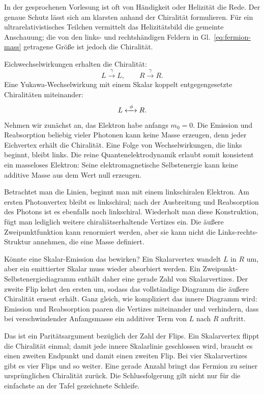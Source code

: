 In der gesprochenen Vorlesung ist oft von Händigkeit oder Helizität die Rede. Der genaue Schutz lässt sich am klarsten anhand der Chiralität formulieren. Für ein ultrarelativistisches Teilchen vermittelt das Helizitätsbild die gemeinte Anschauung; die von den links- und rechtshändigen Feldern in Gl.~\eqref{eq:fermion-mass} getragene Größe ist jedoch die Chiralität.

Eichwechselwirkungen erhalten die Chiralität:
\begin{equation}
L\xrightarrow{\ \gamma\ }L,
\qquad
R\xrightarrow{\ \gamma\ }R.
\label{eq:gauge-preserves-chirality}
\end{equation}
Eine Yukawa-Wechselwirkung mit einem Skalar koppelt entgegengesetzte Chiralitäten miteinander:
\begin{equation}
L\xleftrightarrow{\ \phi\ }R.
\label{eq:scalar-flips-chirality}
\end{equation}
Nehmen wir zunächst an, das Elektron habe anfangs \(m_0=0\). Die Emission und Reabsorption beliebig vieler Photonen kann keine Masse erzeugen, denn jeder Eichvertex erhält die Chiralität. Eine Folge von Wechselwirkungen, die links beginnt, bleibt links. Die reine Quantenelektrodynamik erlaubt somit konsistent ein masseloses Elektron: Seine elektromagnetische Selbstenergie kann keine additive Masse aus dem Wert null erzeugen.

Betrachtet man die Linien, beginnt man mit einem linkschiralen Elektron. Am ersten Photonvertex bleibt es linkschiral; nach der Ausbreitung und Reabsorption des Photons ist es ebenfalls noch linkschiral. Wiederholt man diese Konstruktion, fügt man lediglich weitere chiraliätserhaltende Vertizes ein. Die äußere Zweipunktfunktion kann renormiert werden, aber sie kann nicht die Links-rechts-Struktur annehmen, die eine Masse definiert.

Könnte eine Skalar-Emission das bewirken? Ein Skalarvertex wandelt \(L\) in \(R\) um, aber ein emittierter Skalar muss wieder absorbiert werden. Ein Zweipunkt-Selbstenergiediagramm enthält daher eine gerade Zahl von Skalarvertizes. Der zweite Flip kehrt den ersten um, sodass das vollständige Diagramm die äußere Chiralität erneut erhält. Ganz gleich, wie kompliziert das innere Diagramm wird: Emission und Reabsorption paaren die Vertizes miteinander und verhindern, dass bei verschwindender Anfangsmasse ein additiver Term von \(L\) nach \(R\) auftritt.

Das ist ein Paritätsargument bezüglich der Zahl der Flips. Ein Skalarvertex flippt die Chiralität einmal; damit jede innere Skalarlinie geschlossen wird, braucht es einen zweiten Endpunkt und damit einen zweiten Flip. Bei vier Skalarvertizes gibt es vier Flips und so weiter. Eine gerade Anzahl bringt das Fermion zu seiner ursprünglichen Chiralität zurück. Die Schlussfolgerung gilt nicht nur für die einfachste an der Tafel gezeichnete Schleife.

